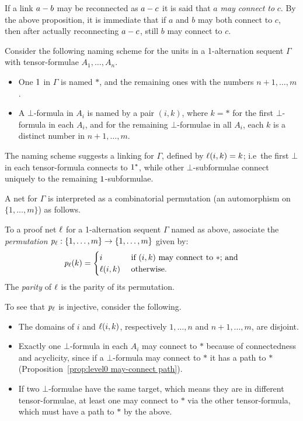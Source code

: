 If a link $a-b$ may be reconnected as $a-c$ it is said that $a$ \emph{may connect to} $c$. 
%
By the above proposition, it is immediate that if $a$ and $b$ may both connect to $c$, then after actually reconnecting $a-c$, still $b$ may connect to $c$.



Consider the following naming scheme for the units in a 1-alternation sequent $\Gamma$ with tensor-formulae $A_1,\dotsc,A_n$.
%
\begin{itemize}

	\item
One $1$ in $\Gamma$ is named $*$, and the remaining ones with the numbers $n+1,\dotsc,m$.

	\item
A $\bot$-formula in $A_i$ is named by a pair $(i,k)$, where $k=*$ for the first $\bot$-formula in each $A_i$, and for the remaining $\bot$-formulae in all $A_i$, each $k$ is a distinct number in $n+1,\dotsc,m$.

\end{itemize}
%
The naming scheme suggests a linking for $\Gamma$, defined by $\ell(i,k)=k$; i.e\ the first $\bot$ in each tensor-formula connects to $1^{*}$, while other $\bot$-subformulae connect uniquely to the remaining $1$-subformulae.



A net for $\Gamma$ is interpreted as a combinatorial permutation (an automorphism on $\{1,\dotsc,m\}$) as follows.
%
\begin{definition}
\label{def:combinatorial permutation}
To a proof net $\ell$ for a 1-alternation sequent $\Gamma$ named as above, associate the \emph{permutation} $\mathit p_{\ell}:\{1,\dotsc,m\}\to\{1,\dotsc,m\}$ given by:
\[
	\mathit p_{\ell}(k) = 
	\begin{cases}
		i				& \text{ if $(i,k)$ may connect to $*$; and}
	\\	\ell(i,k)		& \text{ otherwise.}
	\end{cases}
\]
The \emph{parity} of $\ell$ is the parity of its permutation.
\end{definition}


To see that $\mathit p_{\ell}$ is injective, consider the following.
\begin{itemize}
	\item The domains of $i$ and $\ell(i,k)$, respectively $1,\dotsc,n$ and $n+1,\dotsc,m$, are disjoint.
	\item Exactly one $\bot$-formula in each $A_i$ may connect to $*$ because of connectedness and acyclicity, since if a $\bot$-formula may connect to $*$ it has a path to $*$ (Proposition~\ref{prop:level0 may-connect path}).
	\item If two $\bot$-formulae have the same target, which means they are in different tensor-formulae, at least one may connect to $*$ via the other tensor-formula, which must have a path to $*$ by the above.
\end{itemize}



